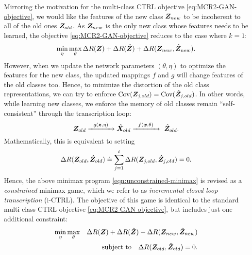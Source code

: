 \documentclass[\toplevelprefix/book-main.tex]{subfiles}
\begin{document}
Mirroring the motivation for the multi-class CTRL objective \eqref{eq:MCR2-GAN-objective}, we would like the features of the new class $\bm{Z}_{new}$ to be incoherent to all of the old ones $\bm{Z}_{old}$. As $\bm{Z}_{new}$ is the only new class whose features needs to be learned, the objective \eqref{eq:MCR2-GAN-objective} reduces to the case where $k=1$:
\begin{equation}
\min_\eta \max_\theta \Delta{R(\bm{Z})}+\Delta{R(\hat{\bm{Z}})}+\Delta{R(\bm{Z}_{new},\hat{\bm{Z}}_{new})}.
\label{eqn:unconstrained-minimax}
\end{equation}
However, when we update the network parameters $(\theta, \eta)$ to optimize the features for the new class, the updated mappings $f$ and $g$ will change features of the old classes too. Hence, to minimize the distortion of the old class representations, we can try to enforce $\mbox{Cov}(\bm{Z}_{j,old}) = \mbox{Cov}(\hat{\bm{Z}}_{j,old})$. In other words, while learning new classes, we enforce the memory of old classes remain ``self-consistent'' through the transcription loop:
\begin{equation}
\bm{Z}_{old} \xrightarrow{\hspace{2mm} g(\bm{z},\eta) \hspace{2mm}} \hat {\bm{X}}_{old} \xrightarrow{\hspace{2mm} f(\bm{x}, \theta)\hspace{2mm}} \ \hat {\bm{Z}}_{old}.
\end{equation}
Mathematically, this is equivalent to setting 
$$\Delta R(\bm{Z}_{old},\hat{\bm{Z}}_{old}) \doteq  \sum_{j=1}^t \Delta R(\bm{Z}_{j,old},\hat{\bm{Z}}_{j,old}) = 0.$$  
Hence, the above minimax program \eqref{eqn:unconstrained-minimax} is revised as a {\em constrained} minimax game, which we refer to as  {\em incremental closed-loop transcription} (i-CTRL).
The objective of this game is identical to the standard multi-class CTRL objective \eqref{eq:MCR2-GAN-objective}, but includes just one additional constraint:
\begin{eqnarray}
\min_\eta \max_\theta  &&\Delta{R(\bm{Z})}+\Delta{R(\hat{\bm{Z}})}+\Delta{R(\bm{Z}_{new},\hat{\bm{Z}}_{new})} \nonumber\\
&& \mbox{subject to} \quad  \Delta R(\bm{Z}_{old},\hat{\bm{Z}}_{old}) = 0.
\label{eqn:constrained-minimax}
\end{eqnarray}
\end{document}
